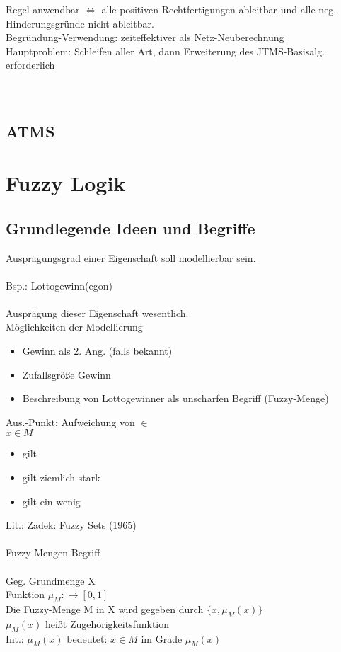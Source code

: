 \documentclass[a4paper,14pt]{article}
\begin{document}
Regel anwendbar $\Leftrightarrow$  alle positiven Rechtfertigungen ableitbar und alle neg. Hinderungsgründe nicht ableitbar.\\
Begründung-Verwendung: zeiteffektiver als Netz-Neuberechnung\\
Hauptproblem: Schleifen aller Art, dann Erweiterung des JTMS-Basisalg. erforderlich\\
\\
\\

\subsection{ATMS}

\section{Fuzzy Logik}
\subsection{Grundlegende Ideen und Begriffe}

Ausprägungsgrad einer Eigenschaft soll modellierbar sein.\\
\\
Bsp.: Lottogewinn(egon)\\
\\
Ausprägung dieser Eigenschaft wesentlich.\\
Möglichkeiten der Modellierung
\begin{itemize}
 \item Gewinn als 2. Ang. (falls bekannt)
 \item Zufallsgröße Gewinn
 \item Beschreibung von Lottogewinner als unscharfen Begriff (Fuzzy-Menge)
\end{itemize}

Aus.-Punkt: Aufweichung von \glqq{}$\in$\grqq{}\\
$x\in M$
\begin{itemize}
 \item gilt
 \item gilt ziemlich stark
 \item gilt ein wenig
\end{itemize}



Lit.: Zadek: Fuzzy Sets (1965)\\
\\
Fuzzy-Mengen-Begriff\\
\\
Geg. Grundmenge X\\
Funktion $\mu_M:\rightarrow[0,1]$\\
Die \glqq{}Fuzzy-Menge M in X\grqq{} wird gegeben durch $\{x,\mu_M(x)\}$\\
$\mu_M(x)$ heißt Zugehörigkeitsfunktion\\
Int.:
$\mu_M(x)$ bedeutet: $x\in M$ im Grade $\mu_M(x)$\\
\end{document}

